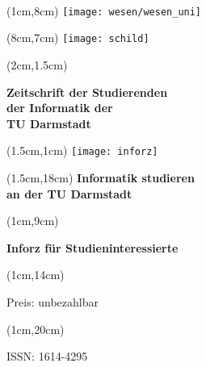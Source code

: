 \begin{titlepage}~


    \begin{textblock*}{12cm}(1cm,8cm)
        \texttt{[image: wesen/wesen\_uni]}
    \end{textblock*}

    \begin{textblock*}{10cm}(8cm,7cm)
        \texttt{[image: schild]}
    \end{textblock*}


    \begin{textblock*}{12cm}(2cm,1.5cm)
        \begin{flushleft}
            \large\sffamily\textbf{
                \newline
                Zeitschrift der Studierenden\\
                der Informatik der \\
                TU Darmstadt}
        \end{flushleft}
    \end{textblock*}


    \begin{textblock*}{12cm}(1.5cm,1cm)
        \texttt{[image: inforz]}
    \end{textblock*}


    \begin{textblock*}{12cm}(1.5cm,18cm)
        \centering\Huge\sffamily\textbf{
            Informatik studieren \\
            an der TU Darmstadt}
    \end{textblock*}



    \begin{textblock*}{5cm}(1cm,9cm)
        \begin{rotate}{90}
            \sffamily\huge\textbf{
                Inforz für Studieninteressierte \the\year}
        \end{rotate}
    \end{textblock*}


    \begin{textblock*}{2cm}(1cm,14cm)
        \begin{rotate}{90}
            \sffamily\small Preis: unbezahlbar
        \end{rotate}
    \end{textblock*}


    \begin{textblock*}{2cm}(1cm,20cm)
        \begin{rotate}{90}
            \sffamily ISSN: 1614-4295
        \end{rotate}
    \end{textblock*}

\end{titlepage}
\newpage
